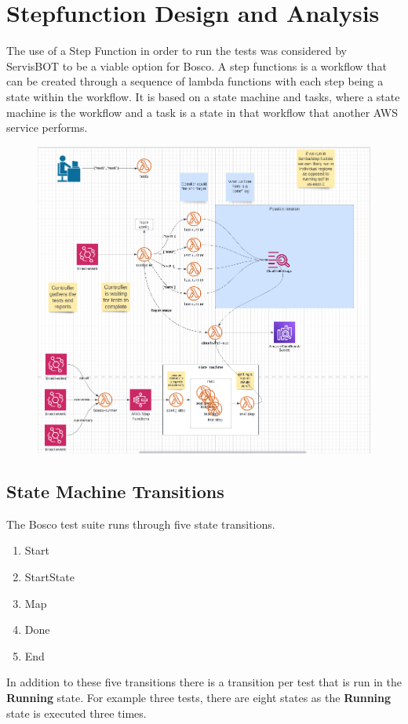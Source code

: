 \documentclass[12pt,a4paper,titlepage]{report}
\begin{document}
\section{Stepfunction Design and Analysis}

The use of a Step Function in order to run the tests was considered by ServisBOT to be a viable option for Bosco. 
A step functions is a workflow that can be created through a sequence of lambda functions with each step being a state within
the workflow. It is based on a state machine and tasks, where a state machine is the workflow and a task is a
state in that workflow that another AWS service performs.

\begin{figure}[H]
 \centering
 \includegraphics[width=15cm]{./diagrams/possible_implementation}
\end{figure}

\subsection{State Machine Transitions}

The Bosco test suite runs through five state transitions. 
\begin{enumerate}
  \item Start 
  \item StartState 
  \item Map 
  \item Done 
  \item End 
\end{enumerate}
In addition to these five transitions there is a transition per test that is run in the \textbf{Running} state. 
For example three tests, there are eight states as the \textbf{Running} state is executed three times. 
\end{document}
